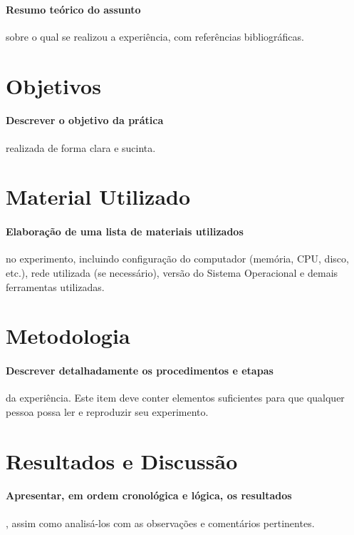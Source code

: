 \documentclass[10pt, a4paper]{article}
\begin{document}
    \paragraph{Resumo teórico do assunto} sobre o qual se realizou a experiência, com referências bibliográficas.
    
	\section{Objetivos}
    \paragraph{Descrever o objetivo da prática} realizada de forma clara e sucinta.

    \section{Material Utilizado}

    \paragraph{Elaboração de uma lista de materiais utilizados} no experimento, incluindo configuração do computador (memória, CPU, disco, etc.), rede utilizada (se necessário), versão do Sistema Operacional e demais ferramentas utilizadas.
    
    \section{Metodologia}

    \paragraph{Descrever detalhadamente os procedimentos e etapas} da experiência. Este item deve conter elementos suficientes para que qualquer pessoa possa ler e reproduzir seu experimento.

    \section{Resultados e Discussão}

    \paragraph{Apresentar, em ordem cronológica e lógica, os resultados}, assim como analisá-los com as observações e comentários pertinentes. 
\end{document}
